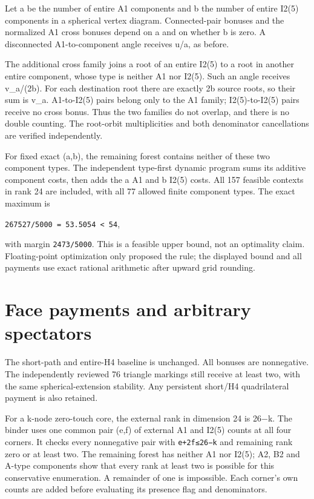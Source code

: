 \documentclass[
  10pt,
]{report}
\begin{document}
Let a be the number of entire A1 components and b the number of entire
I2(5) components in a spherical vertex diagram. Connected-pair bonuses
and the normalized A1 cross bonuses depend on a and on whether b is
zero. A disconnected A1-to-component angle receives u/a, as before.

The additional cross family joins a root of an entire I2(5) to a root in
another entire component, whose type is neither A1 nor I2(5). Such an
angle receives v\_a/(2b). For each destination root there are exactly 2b
source roots, so their sum is v\_a. A1-to-I2(5) pairs belong only to the
A1 family; I2(5)-to-I2(5) pairs receive no cross bonus. Thus the two
families do not overlap, and there is no double counting. The root-orbit
multiplicities and both denominator cancellations are verified
independently.

For fixed exact (a,b), the remaining forest contains neither of these
two component types. The independent type-first dynamic program sums its
additive component costs, then adds the a A1 and b I2(5) costs. All 157
feasible contexts in rank 24 are included, with all 77 allowed finite
component types. The exact maximum is

\texttt{267527/5000\ =\ 53.5054\ \textless{}\ 54},

with margin \texttt{2473/5000}. This is a feasible upper bound, not an
optimality claim. Floating-point optimization only proposed the rule;
the displayed bound and all payments use exact rational arithmetic after
upward grid rounding.

\section{Face payments and arbitrary
spectators}\label{face-payments-and-arbitrary-spectators}

The short-path and entire-H4 baseline is unchanged. All bonuses are
nonnegative. The independently reviewed 76 triangle markings still
receive at least two, with the same spherical-extension stability. Any
persistent short/H4 quadrilateral payment is also retained.

For a k-node zero-touch core, the external rank in dimension 24 is 26−k.
The binder uses one common pair (e,f) of external A1 and I2(5) counts at
all four corners. It checks every nonnegative pair with
\texttt{e+2f≤26−k} and remaining rank zero or at least two. The
remaining forest has neither A1 nor I2(5); A2, B2 and A-type components
show that every rank at least two is possible for this conservative
enumeration. A remainder of one is impossible. Each corner's own counts
are added before evaluating its presence flag and denominators.
\end{document}
